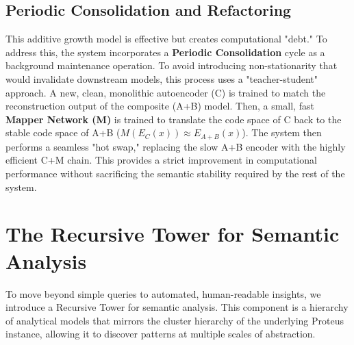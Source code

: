 \documentclass{article}
\begin{document}
\subsection{Periodic Consolidation and Refactoring}
This additive growth model is effective but creates computational "debt." To address this, the system incorporates a \textbf{Periodic Consolidation} cycle as a background maintenance operation. To avoid introducing non-stationarity that would invalidate downstream models, this process uses a "teacher-student" approach. A new, clean, monolithic autoencoder (C) is trained to match the reconstruction output of the composite (A+B) model. Then, a small, fast \textbf{Mapper Network (M)} is trained to translate the code space of C back to the stable code space of A+B ($M(E_C(x)) \approx E_{A+B}(x)$). The system then performs a seamless "hot swap," replacing the slow A+B encoder with the highly efficient C+M chain. This provides a strict improvement in computational performance without sacrificing the semantic stability required by the rest of the system.

\section{The Recursive Tower for Semantic Analysis}

To move beyond simple queries to automated, human-readable insights, we introduce a Recursive Tower for semantic analysis. This component is a hierarchy of analytical models that mirrors the cluster hierarchy of the underlying Proteus instance, allowing it to discover patterns at multiple scales of abstraction.
\end{document}
